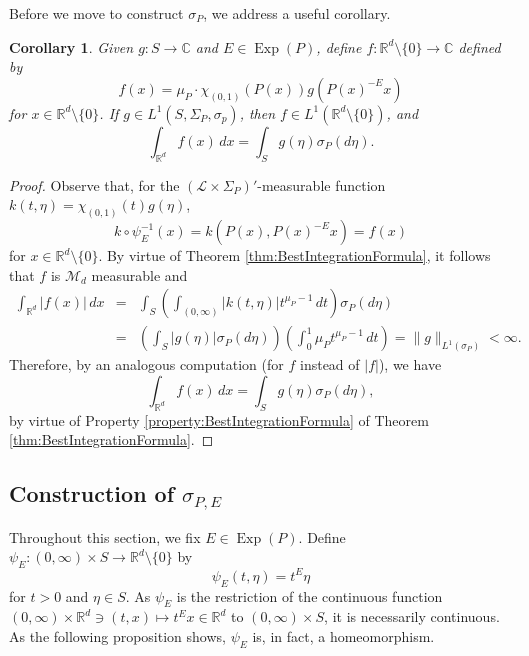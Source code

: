 \documentclass[11pt]{article}
\newtheorem{corollary}[theorem]{Corollary}
\newcommand\Exp{\operatorname{Exp}}
\begin{document}
Before we move to construct $\sigma_P$, we address a useful corollary.  
\begin{corollary}\label{cor:IntegrateOnS}
Given $g:S\to\mathbb{C}$ and $E\in\Exp(P)$, define $f:\mathbb{R}^d\setminus \{0\}\to\mathbb{C}$ defined by
\begin{equation*}
f(x)=\mu_P\cdot \chi_{(0,1)}(P(x))g(P(x)^{-E}x)
\end{equation*}
for $x\in\mathbb{R}^d\setminus\{0\}$. If $g\in L^1(S,\Sigma_P,\sigma_p)$, then $f\in L^1(\mathbb{R}^d\setminus\{0\})$, and 
\begin{equation*}
    \int_{\mathbb{R}^d}f(x)\,dx=\int_Sg(\eta)\sigma_P(d\eta).
\end{equation*}
\end{corollary}
\begin{proof}
Observe that, for the $(\mathcal{L}\times\Sigma_P)'$-measurable function $k(t,\eta)=\chi_{(0,1)}(t)g(\eta)$,
\begin{equation*}
    k\circ\psi_E^{-1}(x)=k(P(x),P(x)^{-E}x)=f(x)
\end{equation*}
for $x\in\mathbb{R}^d\setminus \{0\}$. By virtue of Theorem \ref{thm:BestIntegrationFormula}, it follows that $f$ is $\mathcal{M}_d$ measurable and 
\begin{eqnarray*}
   \int_{\mathbb{R}^d}|f(x)|\,dx&=&\int_{S}\left(\int_{(0,\infty)}|k(t,\eta)|t^{\mu_P-1}\,dt\right)\sigma_P(d\eta)\\
    &=&\left(\int_S|g(\eta)|\sigma_P(d\eta)\right)\left(\int_0^1 \mu_P t^{\mu_P-1}\,dt\right)=\|g\|_{L^1(\sigma_P)}<\infty.
\end{eqnarray*}
Therefore, by an analogous computation (for $f$ instead of $|f|$), we have
\begin{equation*}
    \int_{\mathbb{R}^d}f(x)\,dx=\int_S g(\eta)\sigma_P(d\eta),
\end{equation*}
by virtue of Property \ref{property:BestIntegrationFormula} of Theorem \ref{thm:BestIntegrationFormula}. 
\end{proof}










\subsection{Construction of $\sigma_{P,E}$}\label{subsec:ConstructionofSigma}

Throughout this section, we fix $E\in\Exp(P)$. Define $\psi_E:(0,\infty)\times S\to\mathbb{R}^d\setminus\{0\}$ by
\begin{equation}\label{eq:Homeomorphism}
\psi_E(t,\eta)=t^E\eta
\end{equation}
for $t>0$ and $\eta\in S$. As $\psi_E$ is the restriction of the continuous function $(0,\infty)\times \mathbb{R}^d\ni (t,x)\mapsto t^E x\in\mathbb{R}^d$ to $(0,\infty)\times S$, it is necessarily continuous. As the following proposition shows, $\psi_E$ is, in fact, a homeomorphism.
\end{document}

